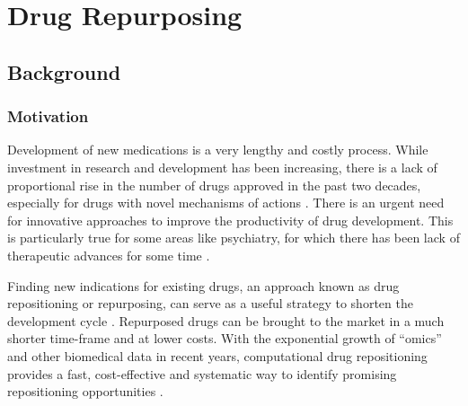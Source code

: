\chapter{Drug Repurposing}
\label{chap:Repurposing}

\section{Background}
  \subsection{Motivation}
    Development of new medications is a very lengthy and costly process. While investment in research and development has been increasing, there is a lack of proportional rise in the number of drugs approved in the past two decades, especially for drugs with novel mechanisms of actions \cite{pammolli2011productivity}. There is an urgent need for innovative approaches to improve the productivity of drug development. This is particularly true for some areas like psychiatry, for which there has been lack of therapeutic advances for some time \cite{krystal2014psychiatric,hyman2013psychiatric}.
    
    Finding new indications for existing drugs, an approach known as drug repositioning or repurposing, can serve as a useful strategy to shorten the development cycle \cite{dudley2011exploiting}. Repurposed drugs can be brought to the market in a much shorter time-frame and at lower costs. With the exponential growth of “omics” and other biomedical data in recent years, computational drug repositioning provides a fast, cost-effective and systematic way to identify promising repositioning opportunities \cite{dudley2011exploiting}.

